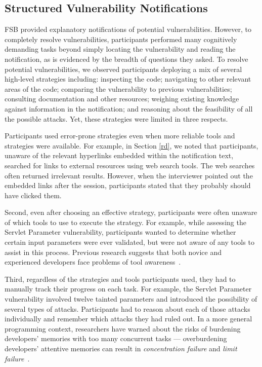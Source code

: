 \documentclass[10pt,journal,compsoc]{IEEEtran}
\begin{document}
\subsection{Structured Vulnerability Notifications}
\label{structuredNotifications}
FSB provided explanatory notifications of potential vulnerabilities.
However, to completely resolve vulnerabilities,
participants performed many cognitively demanding tasks beyond simply locating the vulnerability and reading the notification, 
as is evidenced by the breadth of questions they asked. 
To resolve potential vulnerabilities, we observed participants deploying a mix of several high-level strategies including: 
inspecting the code;
navigating to other relevant areas of the code; 
comparing the vulnerability to previous vulnerabilities; 
consulting documentation and other resources; 
weighing existing knowledge against information in the notification; 
and reasoning about the feasibility of all the possible attacks. 
Yet, these strategies were limited in three respects.

Participants used error-prone strategies even when more reliable tools and strategies were available. 
For example, in Section \ref{rd}, we noted that participants, unaware of the relevant hyperlinks embedded within the notification text, searched for links to external resources using web search tools. 
The web searches often returned irrelevant results. 
However, when the interviewer pointed out the embedded links after the session, participants stated that they probably should have clicked them. 

Second, even after choosing an effective strategy, participants were often unaware of which tools to use to execute the strategy.
For example, while assessing the Servlet Parameter vulnerability, participants wanted to determine whether certain input parameters were ever validated, but were not aware of any tools to assist in this process.
Previous research suggests that both novice and experienced developers face problems of tool awareness~\cite{murphy-Hill2012fluency}.

Third, regardless of the strategies and tools participants used, they had to manually track their progress on each task.
For example, the Servlet Parameter vulnerability involved twelve tainted parameters and introduced the possibility of several types of attacks. 
Participants had to reason about each of those attacks individually and remember which attacks they had ruled out.
In a more general programming context, researchers have warned about the risks of burdening developers' memories with too many concurrent tasks 
--- overburdening developers' attentive memories can result in \emph{concentration failure} and \emph{limit failure}~\cite{parnin2012programmer}.
\end{document}
